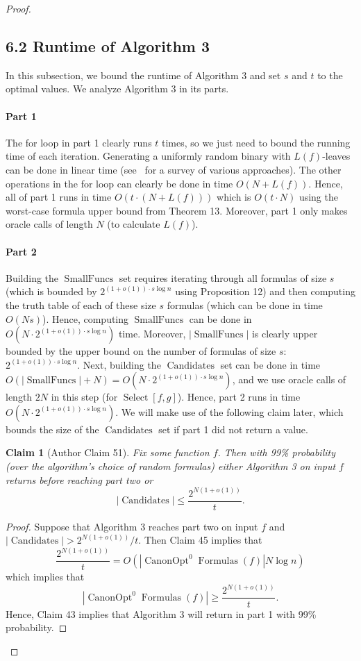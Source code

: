 \documentclass[10pt,a4paper]{article}
\newtheorem{ntclaim}[nttheorem]{Claim}
\newcommand{\Canon}[1]{\operatorname{CanonOpt}^{#1}\!\operatorname{Formulas}}
\newcommand{\Select}{\operatorname{Select}}
\newcommand{\Candidates}{\operatorname{Candidates}}
\begin{document}
\begin{proof}
\subsection*{6.2 Runtime of Algorithm 3}
In this subsection, we bound the runtime of Algorithm 3 and set $s$ and $t$ to the optimal values. We analyze Algorithm 3 in its parts.
\paragraph{Part 1}
The for loop in part 1 clearly runs $t$ times, so we just need to bound the running time of each iteration. Generating a uniformly random binary with $L(f)$-leaves can be done in linear time (see~\cite{ref15} for a survey of various approaches). The other operations in the for loop can clearly be done in time $O(N+L(f))$. Hence, all of part 1 runs in time $O(t\cdot(N+L(f)))$ which is $O(t\cdot N)$ using the worst-case formula upper bound from Theorem 13.
Moreover, part 1 only makes oracle calls of length $N$ (to calculate $L(f)$).
\paragraph{Part 2}
Building the $\operatorname{SmallFuncs}$ set requires iterating through all formulas of size $s$ (which is bounded by $2^{(1+o(1))\cdot s\log n}$ using Proposition 12) and then computing the truth table of each of these size $s$ formulas (which can be done in time $O(Ns)$). Hence, computing $\operatorname{SmallFuncs}$ can be done in $O(N\cdot 2^{(1+o(1))\cdot s\log n})$ time. Moreover, $|\operatorname{SmallFuncs}|$ is clearly upper bounded by the upper bound on the number of formulas of size $s$: $2^{(1+o(1))\cdot s\log n}$.
Next, building the $\Candidates$ set can be done in time $O(|\operatorname{SmallFuncs}|+N)=O(N\cdot 2^{(1+o(1))\cdot s\log n})$, and we use oracle calls of length $2N$ in this step (for $\Select[f,g]$).
Hence, part 2 runs in time $O(N\cdot 2^{(1+o(1))\cdot s\log n})$.
We will make use of the following claim later, which bounds the size of the $\Candidates$ set if part 1 did not return a value.
\begin{ntclaim}[Author Claim 51]
Fix some function $f$. Then with 99\% probability (over the algorithm's choice of random formulas) either Algorithm 3 on input $f$ returns before reaching part two or
\[|\Candidates|\leq\frac{2^{N(1+o(1))}}t.\]
\end{ntclaim}
\begin{proof}
Suppose that Algorithm 3 reaches part two on input $f$ and $|\Candidates|>2^{N(1+o(1))}/t$. Then Claim 45 implies that
\[\frac{2^{N(1+o(1))}}t=O(|\Canon{0}(f)|N\log n)\]
which implies that
\[|\Canon{0}(f)|\geq\frac{2^{N(1+o(1))}}t.\]
Hence, Claim 43 implies that Algorithm 3 will return in part 1 with 99\% probability.
\end{proof}

\end{proof}
\end{document}
